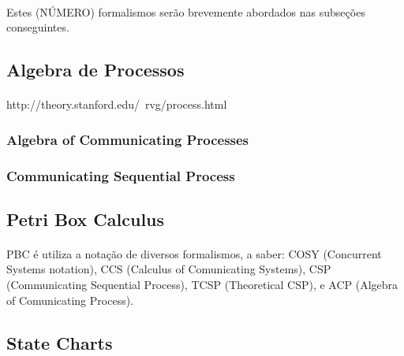 \paragraph{}
Estes (NÚMERO) formalismos serão brevemente abordados nas subseções conseguintes.

\subsection{Algebra de Processos}
\paragraph{}
http://theory.stanford.edu/~rvg/process.html

\subsubsection{Algebra of Communicating Processes}
\paragraph{}
\lipsum[1]

\subsubsection{Communicating Sequential Process}
\paragraph{}
\lipsum[1]

\subsection{Petri Box Calculus}
\paragraph{}
PBC é utiliza a notação de diversos formalismos, a saber: COSY (Concurrent Systems notation), CCS (Calculus of Comunicating Systems),
CSP (Communicating Sequential Process), TCSP (Theoretical CSP), e ACP (Algebra of Comunicating Process).

\subsection{State Charts}
\paragraph{}
~\cite{Harel:1987:SVF:34884.34886}


